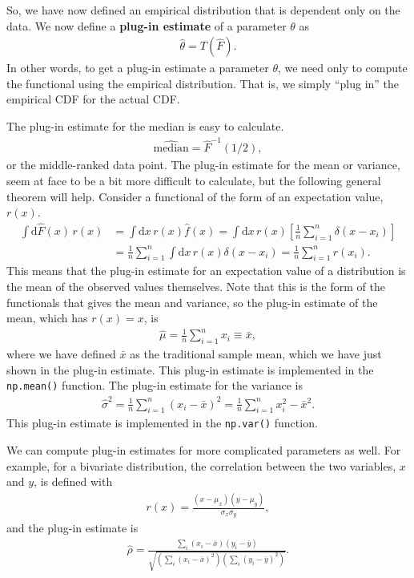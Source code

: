 So, we have now defined an empirical distribution that is dependent only on the data. We now define a \textbf{plug-in estimate} of a parameter $\theta$ as
\begin{align}
    \hat{\theta} = T(\hat{F}).
\end{align}
In other words, to get a plug-in estimate a parameter $\theta$, we need only to compute the functional using the empirical distribution. That is, we simply ``plug in'' the empirical CDF for the actual CDF.

The plug-in estimate for the median is easy to calculate.
\begin{align}
    \widehat{\text{median}} = \hat{F}^{-1}(1/2),
\end{align}
or the middle-ranked data point. The plug-in estimate for the mean or variance, seem at face to be a bit more difficult to calculate, but the following general theorem will help. Consider a functional of the form of an expectation value, $r(x)$.
\begin{align}
    \int\mathrm{d}\hat{F}(x)\,r(x) &= \int \mathrm{d}x \,r(x) \hat{f}(x)
    = \int \mathrm{d}x\, r(x) \left[\frac{1}{n}\sum_{i=1}^n\delta(x - x_i)\right] \nonumber \\
    &= \frac{1}{n}\sum_{i=1}^n\int \mathrm{d}x \,r(x) \delta(x-x_i)
    = \frac{1}{n}\sum_{i=1}^n r(x_i).
\end{align}
This means that the plug-in estimate for an expectation value of a distribution is the mean of the observed values themselves. Note that this is the form of the functionals that gives the mean and variance, so the plug-in estimate of the mean, which has $r(x) = x$, is
\begin{align}
    \hat{\mu} = \frac{1}{n}\sum_{i=1}^n x_i \equiv \bar{x},
\end{align}
where we have defined $\bar{x}$ as the traditional sample mean, which we have just shown in the plug-in estimate. This plug-in estimate is implemented in the \texttt{np.mean()} function. The plug-in estimate for the variance is
\begin{align}
    \hat{\sigma}^2 = \frac{1}{n}\sum_{i=1}^n (x_i - \bar{x})^2
    = \frac{1}{n}\sum_{i=1}^n x_i^2 - \bar{x}^2.
\end{align}
This plug-in estimate is implemented in the \texttt{np.var()} function.

We can compute plug-in estimates for more complicated parameters as well. For example, for a bivariate distribution, the correlation between the two variables, $x$ and $y$, is defined with
\begin{align}
    r(x) = \frac{(x-\mu_x)(y-\mu_y)}{\sigma_x \sigma_y},
\end{align}
and the plug-in estimate is
\begin{align}
    \hat{\rho} = \frac{\sum_i(x_i - \bar{x})(y_i-\bar{y})}{\sqrt{\left(\sum_i(x_i-\bar{x})^2\right)\left(\sum_i(y_i-\bar{y})^2\right)}}.
\end{align}

